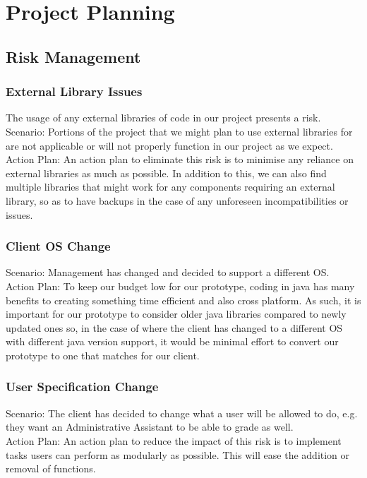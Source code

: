 \documentclass{article}
\begin{document}
\section{Project Planning}
\subsection{Risk Management}
\subsubsection{External Library Issues}
The usage of any external libraries of code in our project presents a risk.\\
Scenario: Portions of the project that we might plan to use external libraries
for are not applicable or will not properly function in our project as
we expect.\\
Action Plan: An action plan to eliminate this risk is to minimise any reliance
on external libraries as much as possible. In addition to this, we can also
find multiple libraries that might work for any components requiring an external
library, so as to have backups in the case of any unforeseen incompatibilities
or issues.

\subsubsection{Client OS Change}
Scenario: Management has changed and decided to support a different OS.\\
Action Plan: To keep our budget low for our prototype, coding in java has many
benefits to creating something time efficient and also cross platform.
As such, it is important for our prototype to consider older java libraries
compared to newly updated ones so, in the case of where the client has changed
to a different OS with different java version support, it would be minimal
effort to convert our prototype to one that matches for our client.
\subsubsection{User Specification Change}
Scenario: The client has decided to change what a user will be allowed to do, e.g.
they want an Administrative Assistant to be able to grade as well.\\
Action Plan: An action plan to reduce the impact of this risk is to implement
tasks users can perform as modularly as possible. This will ease the addition or
removal of functions.
\end{document}
